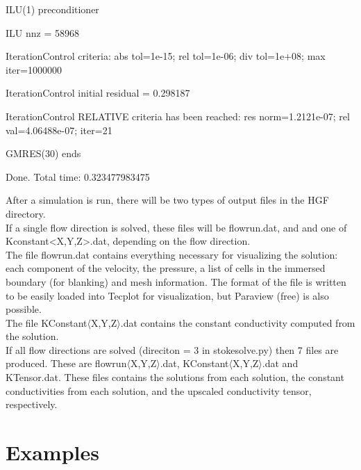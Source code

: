 \documentclass{report}
\begin{document}
\begin{mdframed}[style=MyFrame]
\noindent \hspace{.1cm} ILU(1) preconditioner

\noindent \hspace{.1cm} ILU nnz = 58968

\noindent \hspace{.1cm} IterationControl criteria: abs tol=1e-15; rel tol=1e-06; div tol=1e+08; max iter=1000000

\noindent \hspace{.1cm} IterationControl initial residual = 0.298187

\noindent \hspace{.1cm} IterationControl RELATIVE criteria has been reached: res norm=1.2121e-07; rel val=4.06488e-07; iter=21

\noindent \hspace{.1cm} GMRES(30) ends

\noindent \hspace{.1cm} Done. Total time: 0.323477983475

\end{mdframed}

\noindent After a simulation is run, there will be two types of output files
in the HGF directory.\\

\noindent If a single flow direction is solved, these files will
be flowrun.dat,
and and one of Kconstant<X,Y,Z>.dat, depending on the flow direction.\\

\noindent The file flowrun.dat contains everything necessary for visualizing
the solution: each component of the velocity, the pressure,
a list of cells in the immersed boundary (for blanking) and
mesh information. The format of the file is written to be easily
loaded into Tecplot for visualization, but Paraview (free) is also
possible.\\

\noindent The file KConstant$\langle$X,Y,Z$\rangle$.dat contains the constant conductivity
computed from the solution.\\

\noindent If all flow directions are solved (direciton = 3 in stokesolve.py) then
7 files are produced. These are flowrun$\langle$X,Y,Z$\rangle$.dat,
KConstant$\langle$X,Y,Z$\rangle$.dat and
KTensor.dat. These files contains the solutions from each solution, the constant
conductivities from each solution, and the upscaled conductivity tensor, respectively.

\chapter{Examples}
\end{document}

